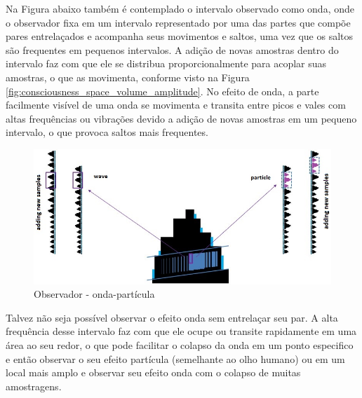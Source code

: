 Na Figura abaixo também é contemplado o intervalo observado como onda, onde o observador fixa em um intervalo representado por uma das partes que compõe pares entrelaçados e acompanha seus movimentos e saltos, uma vez que os saltos são frequentes em pequenos intervalos. A adição de novas amostras dentro do intervalo faz com que ele se distribua proporcionalmente para acoplar suas amostras, o que as movimenta, conforme visto na Figura \ref{fig:consciousness_space_volume_amplitude}. No efeito de onda, a parte facilmente visível de uma onda se movimenta e transita entre picos e vales com altas frequências ou vibrações devido a adição de novas amostras em um pequeno intervalo, o que provoca saltos mais frequentes.
	\begin{figure}[H]
	\caption{Observador - onda-partícula}
	\label{fig:consciousness_space_wave-particle}
	\centering
	\includegraphics[scale=.55]{sections/images/consciousness_space_wave-particle.jpg}
	\end{figure}

Talvez não seja possível observar o efeito onda sem entrelaçar seu par. A alta frequência desse intervalo faz com que ele ocupe ou transite rapidamente em uma área ao seu redor, o que pode facilitar o colapso da onda em um ponto especifico e então observar o seu efeito partícula (semelhante ao olho humano) ou em um local mais amplo e observar seu efeito onda com o colapso de muitas amostragens.

